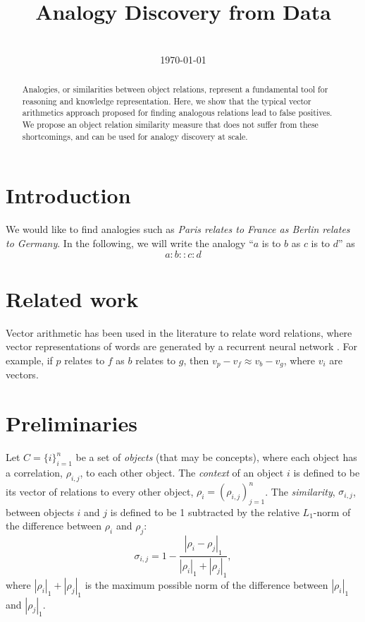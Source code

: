 \documentclass[conference]{IEEEtran}
\newcommand{\rn}[1]{\rho_{#1}}
\newcommand{\rns}[1]{|\rn{#1}|_1}
\newcommand{\sy}[1]{\sigma_{#1}}
\newcommand{\dnm}[2]{|\rn{#1}-\rn{#2}|_1}
\begin{document}
\title{Analogy Discovery from Data}
\author{
  \\
    \today}

\maketitle
\begin{abstract}
Analogies, or similarities between object relations, represent a fundamental tool for reasoning and knowledge representation. Here, we show that the typical vector arithmetics approach proposed for finding analogous relations lead to false positives. We propose an object relation similarity measure that does not suffer from these shortcomings, and can be used for analogy discovery at scale.
\end{abstract}

\section{Introduction}

We would like to find analogies such as \emph{Paris relates to France as Berlin relates to Germany}. In the following, we will write the analogy ``$a$ is to $b$ as $c$ is to $d$'' as
\begin{equation}
a : b :: c : d
\end{equation}

\section{Related work}
Vector arithmetic has been used in the literature to relate word relations, where vector representations
of words are generated by a recurrent neural network \cite{Mikolov2013}. For example, if
$p$ relates to $f$ as $b$ relates to $g$, then $v_{p} - v_{f} \approx v_{b} - v_{g}$, where $v_i$ are
vectors.

\section{Preliminaries}
\label{sec:preliminaries}

Let $C = \{i\}_{i=1}^n$ be a set of \emph{objects} (that may be concepts), where each object has a
correlation, $\rn{i,j}$, to each other object. The \emph{context} of an object $i$ is defined to be its
vector of relations to every other object, $\rn{i} = (\rn{i,j})_{j=1}^n$. The \emph{similarity}, $\sy{i,j}$, between
objects $i$ and $j$ is defined to be 1 subtracted by the relative $L_1$-norm of the difference between $\rn{i}$ and $\rn{j}$:
\begin{equation}\label{eq:sim}
\sy{i,j} = 1 - \frac{\dnm{i}{j}}{\rns{i} + \rns{j}},
\end{equation}
where $\rns{i} + \rns{j}$ is the maximum possible norm of the difference between $\rns{i}$ and $\rns{j}$.
\end{document}
